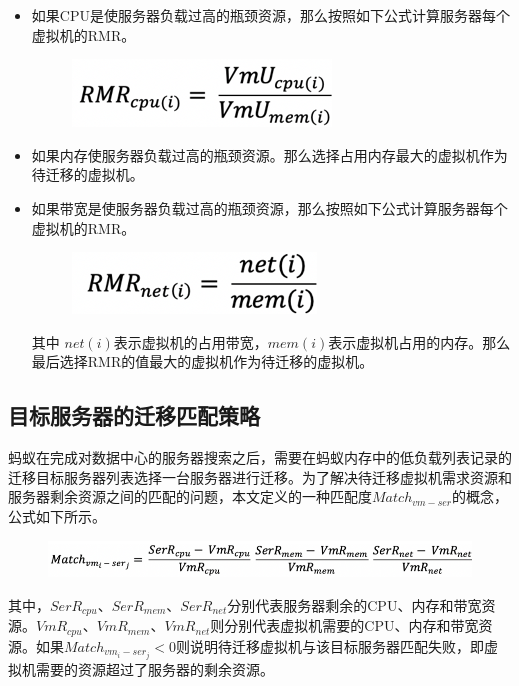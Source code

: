\begin{itemize}
 \item 如果CPU是使服务器负载过高的瓶颈资源，那么按照如下公式计算服务器每个虚拟机的RMR。

        \begin{figure}[H]
          \centering
          \includegraphics{./Figure/IMG_Chap3_12.png}
        \end{figure}

 \item 如果内存使服务器负载过高的瓶颈资源。那么选择占用内存最大的虚拟机作为待迁移的虚拟机。
 \item 如果带宽是使服务器负载过高的瓶颈资源，那么按照如下公式计算服务器每个虚拟机的RMR。

        \begin{figure}[H]
          \centering
          \includegraphics{./Figure/IMG_Chap3_13.png}
        \end{figure}

        其中 $ net(i) $表示虚拟机的占用带宽，$ mem(i) $表示虚拟机占用的内存。那么最后选择RMR的值最大的虚拟机作为待迁移的虚拟机。
 \end{itemize}

\subsection{目标服务器的迁移匹配策略}
蚂蚁在完成对数据中心的服务器搜索之后，需要在蚂蚁内存中的低负载列表记录的迁移目标服务器列表选择一台服务器进行迁移。为了解决待迁移虚拟机需求资源和服务器剩余资源之间的匹配的问题，本文定义的一种匹配度$ Match_{vm-ser} $的概念，公式如下所示。

\begin{figure}[htp]
  \centering
  \includegraphics{./Figure/IMG_Chap3_14.png}
\end{figure}

其中，$ SerR_{cpu} $、$ SerR_{mem} $、$ SerR_{net} $分别代表服务器剩余的CPU、内存和带宽资源。$ VmR_{cpu} $、$ VmR_{mem} $、$ VmR_{net} $则分别代表虚拟机需要的CPU、内存和带宽资源。如果$ Match_{vm_i-ser_j} < 0 $则说明待迁移虚拟机与该目标服务器匹配失败，即虚拟机需要的资源超过了服务器的剩余资源。

